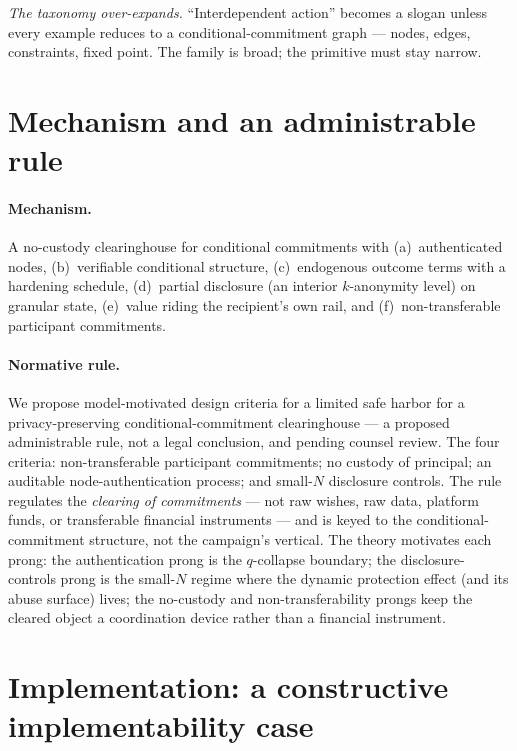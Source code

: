 \documentclass[11pt]{article}
\theoremstyle{definition}
\theoremstyle{remark}
\begin{document}
\emph{The taxonomy over-expands.} ``Interdependent action'' becomes a slogan unless every
example reduces to a conditional-commitment graph --- nodes, edges, constraints, fixed
point. The family is broad; the primitive must stay narrow.

\section{Mechanism and an administrable rule}\label{sec:rule}

\paragraph{Mechanism.} A no-custody clearinghouse for conditional commitments with
(a)~authenticated nodes, (b)~verifiable conditional structure, (c)~endogenous outcome
terms with a hardening schedule, (d)~partial disclosure (an interior $k$-anonymity level)
on granular state, (e)~value riding the recipient's own rail, and (f)~non-transferable
participant commitments.

\paragraph{Normative rule.} We propose model-motivated design criteria for a limited
safe harbor for a privacy-preserving conditional-commitment clearinghouse --- a proposed
administrable rule, not a legal conclusion, and pending counsel review. The four criteria:
non-transferable participant commitments; no custody of principal; an auditable
node-authentication process; and small-$N$ disclosure controls. The rule regulates the
\emph{clearing of commitments} --- not raw wishes, raw data, platform funds, or
transferable financial instruments --- and is keyed to the conditional-commitment
structure, not the campaign's vertical. The theory motivates each prong: the
authentication prong is the $q$-collapse boundary; the disclosure-controls prong is the
small-$N$ regime where the dynamic protection effect (and its abuse surface) lives; the
no-custody and non-transferability prongs keep the cleared object a coordination device
rather than a financial instrument.

\section{Implementation: a constructive implementability case}\label{sec:constructive}
\end{document}

